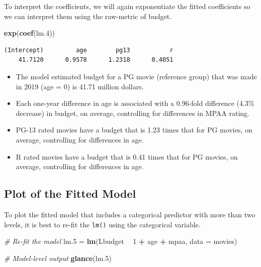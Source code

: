 \documentclass[]{book}
\newenvironment{Shaded}{\begin{snugshade}}{\end{snugshade}}
\newcommand{\CommentTok}[1]{\textcolor[rgb]{0.56,0.35,0.01}{\textit{#1}}}
\newcommand{\DataTypeTok}[1]{\textcolor[rgb]{0.13,0.29,0.53}{#1}}
\newcommand{\DecValTok}[1]{\textcolor[rgb]{0.00,0.00,0.81}{#1}}
\newcommand{\FloatTok}[1]{\textcolor[rgb]{0.00,0.00,0.81}{#1}}
\newcommand{\KeywordTok}[1]{\textcolor[rgb]{0.13,0.29,0.53}{\textbf{#1}}}
\newcommand{\NormalTok}[1]{#1}
\newcommand{\OperatorTok}[1]{\textcolor[rgb]{0.81,0.36,0.00}{\textbf{#1}}}
\newcommand{\StringTok}[1]{\textcolor[rgb]{0.31,0.60,0.02}{#1}}
\providecommand{\tightlist}{%
  \setlength{\itemsep}{0pt}\setlength{\parskip}{0pt}}
\begin{document}
To interpret the coefficients, we will again exponentiate the fitted coefficients so we can interpret them using the raw-metric of budget.

\begin{Shaded}
\begin{Highlighting}[]
\KeywordTok{exp}\NormalTok{(}\KeywordTok{coef}\NormalTok{(lm}\FloatTok{.4}\NormalTok{))}
\end{Highlighting}
\end{Shaded}

\begin{verbatim}
(Intercept)         age        pg13           r 
    41.7120      0.9578      1.2318      0.4051 
\end{verbatim}

\begin{itemize}
\tightlist
\item
  The model estimated budget for a PG movie (reference group) that was made in 2019 (age = 0) is 41.71 million dollars.
\item
  Each one-year difference in age is associated with a 0.96-fold difference (4.3\% decrease) in budget, on average, controlling for differences in MPAA rating.
\item
  PG-13 rated movies have a budget that is 1.23 times that for PG movies, on average, controlling for differences in age.
\item
  R rated movies have a budget that is 0.41 times that for PG movies, on average, controlling for differences in age.
\end{itemize}

\hypertarget{plot-of-the-fitted-model}{%
\subsection{Plot of the Fitted Model}\label{plot-of-the-fitted-model}}

To plot the fitted model that includes a categorical predictor with more than two levels, it is best to re-fit the \texttt{lm()} using the categorical variable.

\begin{Shaded}
\begin{Highlighting}[]
\CommentTok{# Re-fit the model}
\NormalTok{lm}\FloatTok{.5}\NormalTok{ =}\StringTok{ }\KeywordTok{lm}\NormalTok{(Lbudget }\OperatorTok{~}\StringTok{ }\DecValTok{1} \OperatorTok{+}\StringTok{ }\NormalTok{age }\OperatorTok{+}\StringTok{ }\NormalTok{mpaa, }\DataTypeTok{data =}\NormalTok{ movies)}

\CommentTok{# Model-level output}
\KeywordTok{glance}\NormalTok{(lm}\FloatTok{.5}\NormalTok{)}
\end{Highlighting}
\end{Shaded}
\end{document}

